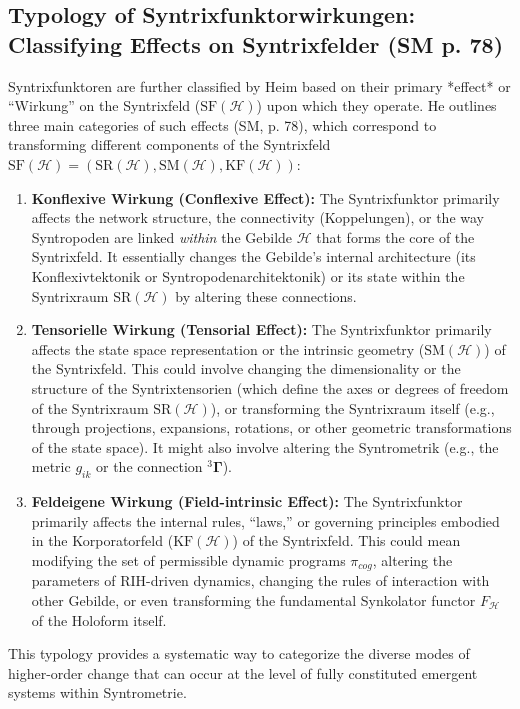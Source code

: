 \documentclass[
    12pt,              %
    a4paper,           %
    headings=normal,   %
    twoside=true,      %
    BCOR=8mm,          %
]{scrbook}
\newcommand{\q}[1]{\enquote{#1}}
\begin{document}
\subsection{Typology of Syntrixfunktorwirkungen: Classifying Effects on Syntrixfelder (SM p. 78)}
\label{sec:ch4_sf_typology_revised_2}

Syntrixfunktoren are further classified by Heim based on their primary *effect* or \q{Wirkung} on the Syntrixfeld (\(\text{SF}(\mathcal{H})\)) upon which they operate. He outlines three main categories of such effects (SM, p. 78), which correspond to transforming different components of the Syntrixfeld \(\text{SF}(\mathcal{H}) = (\text{SR}(\mathcal{H}), \text{SM}(\mathcal{H}), \text{KF}(\mathcal{H}))\):

\begin{enumerate}[label=(\alph*)]
    \item  \textbf{Konflexive Wirkung (Conflexive Effect):} The Syntrixfunktor primarily affects the network structure, the connectivity (Koppelungen), or the way Syntropoden are linked \textit{within} the Gebilde \(\mathcal{H}\) that forms the core of the Syntrixfeld. It essentially changes the Gebilde’s internal architecture (its Konflexivtektonik or Syntropodenarchitektonik) or its state within the Syntrixraum \(\text{SR}(\mathcal{H})\) by altering these connections.

    \item  \textbf{Tensorielle Wirkung (Tensorial Effect):} The Syntrixfunktor primarily affects the state space representation or the intrinsic geometry (\(\text{SM}(\mathcal{H})\)) of the Syntrixfeld. This could involve changing the dimensionality or the structure of the Syntrixtensorien (which define the axes or degrees of freedom of the Syntrixraum \(\text{SR}(\mathcal{H})\)), or transforming the Syntrixraum itself (e.g., through projections, expansions, rotations, or other geometric transformations of the state space). It might also involve altering the Syntrometrik (e.g., the metric \(g_{ik}\) or the connection \({}^3\bm{\Gamma}\)).

    \item  \textbf{Feldeigene Wirkung (Field-intrinsic Effect):} The Syntrixfunktor primarily affects the internal rules, \q{laws,} or governing principles embodied in the Korporatorfeld (\(\text{KF}(\mathcal{H})\)) of the Syntrixfeld. This could mean modifying the set of permissible dynamic programs \(\pi_{cog}\), altering the parameters of RIH-driven dynamics, changing the rules of interaction with other Gebilde, or even transforming the fundamental Synkolator functor \(F_\mathcal{H}\) of the Holoform itself.
\end{enumerate}
This typology provides a systematic way to categorize the diverse modes of higher-order change that can occur at the level of fully constituted emergent systems within Syntrometrie.
\end{document}
